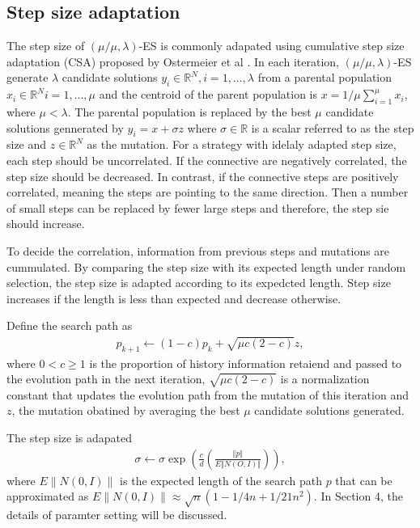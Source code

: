 \subsection{Step size adaptation}

The step size of $(\mu/\mu,\lambda)$-ES is commonly adapated using cumulative step size adaptation (CSA) proposed by Ostermeier et al \cite{Ostermeier:1994:DAS:1326675.1326679}. In each iteration, $(\mu/\mu,\lambda)$-ES generate $\lambda$ candidate solutions $y_i \in \mathbb{R}^N,i=1,...,\lambda$ from a parental population $x_i \in \mathbb{R}^N i=1,...,\mu$ and the centroid of the parent population is $x = 1/\mu \sum_{i=1}^\mu x_i$, where $\mu < \lambda$. The parental population is replaced by the best $\mu$ candidate solutions gennerated by $y_i = x + \sigma z$ where $\sigma \in \mathbb{R}$ is a scalar referred to as the step size and $z \in \mathbb{R}^N$ as the mutation. For a strategy with idelaly adapted step size, each step should be uncorrelated. If the connective are negatively correlated, the step size should be decreased. In contrast, if the connective steps are positively correlated, meaning the steps are pointing to the same direction. Then a number of small steps can be replaced by fewer large steps and therefore, the step sie should increase. 

To decide the correlation, information from previous steps and mutations are cummulated. By comparing the step size with its expected length under random selection, the step size is adapted according to its expedcted length. Step size increases if the length is less than expected and decrease otherwise. 

Define the search path as 
\begin{align}
p_{k+1} \leftarrow (1-c)p_k + \sqrt{\mu c (2-c)} z,
\end{align}
where $0<c \geq 1$ is the proportion of history information retaiend and passed to the evolution path in the next iteration, $ \sqrt{\mu c (2-c)}$ is a normalization constant that updates the evolution path from the mutation of this iteration and $z$, the mutation obatined by averaging the best $\mu$ candidate solutions generated. 

The step size is adapated 
\begin{align}
\sigma \leftarrow \sigma \exp \left (  \frac{c}{d}  \left( \frac{\Vert p\Vert}{E \Vert N(O,I)\Vert } \right) \right ),
\end{align}
where $E\| N(0,I) \|$ is the expected length of the search path $p$ that can be approximated as $E\| N(0,I) \| \approx \sqrt{n} (1-1/4n + 1/21n^2)$. In Section 4, the details of paramter setting will be discussed.

